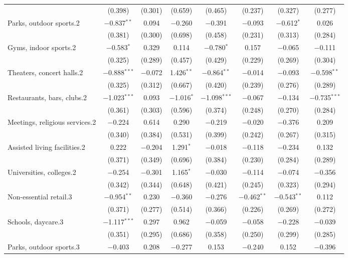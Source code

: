 \begin{table}[!htbp]
\begin{tabular}{@{\extracolsep{5pt}}lccccccc}
  & (0.398) & (0.301) & (0.659) & (0.465) & (0.237) & (0.327) & (0.277) \\ 
  Parks, outdoor sports.2 & $-$0.837$^{**}$ & 0.094 & $-$0.260 & $-$0.391 & $-$0.093 & $-$0.612$^{*}$ & 0.026 \\ 
  & (0.381) & (0.300) & (0.698) & (0.458) & (0.231) & (0.313) & (0.284) \\ 
  Gyms, indoor sports.2 & $-$0.583$^{*}$ & 0.329 & 0.114 & $-$0.780$^{*}$ & 0.157 & $-$0.065 & $-$0.111 \\ 
  & (0.325) & (0.289) & (0.457) & (0.429) & (0.229) & (0.269) & (0.304) \\ 
  Theaters, concert halls.2 & $-$0.888$^{***}$ & $-$0.072 & 1.426$^{**}$ & $-$0.864$^{**}$ & $-$0.014 & $-$0.093 & $-$0.598$^{**}$ \\ 
  & (0.325) & (0.312) & (0.667) & (0.420) & (0.239) & (0.276) & (0.289) \\ 
  Restaurants, bars, clubs.2 & $-$1.023$^{***}$ & 0.093 & $-$1.016$^{*}$ & $-$1.098$^{***}$ & $-$0.067 & $-$0.134 & $-$0.735$^{***}$ \\ 
  & (0.361) & (0.303) & (0.596) & (0.374) & (0.248) & (0.270) & (0.284) \\ 
  Meetings, religious services.2 & $-$0.224 & 0.614 & 0.290 & $-$0.219 & $-$0.020 & $-$0.376 & 0.209 \\ 
  & (0.340) & (0.384) & (0.531) & (0.399) & (0.242) & (0.267) & (0.315) \\ 
  Assisted living facilities.2 & 0.222 & $-$0.204 & 1.291$^{*}$ & $-$0.018 & $-$0.118 & $-$0.234 & 0.132 \\ 
  & (0.371) & (0.349) & (0.696) & (0.384) & (0.230) & (0.284) & (0.289) \\ 
  Universities, colleges.2 & $-$0.254 & $-$0.301 & 1.165$^{*}$ & $-$0.030 & $-$0.114 & $-$0.074 & $-$0.356 \\ 
  & (0.342) & (0.344) & (0.648) & (0.421) & (0.245) & (0.323) & (0.294) \\ 
  Non-essential retail.3 & $-$0.954$^{**}$ & 0.230 & $-$0.360 & $-$0.276 & $-$0.462$^{**}$ & $-$0.543$^{**}$ & 0.112 \\ 
  & (0.371) & (0.277) & (0.514) & (0.366) & (0.226) & (0.269) & (0.272) \\ 
  Schools, daycare.3 & $-$1.117$^{***}$ & 0.297 & 0.962 & $-$0.059 & $-$0.058 & $-$0.228 & $-$0.039 \\ 
  & (0.351) & (0.295) & (0.686) & (0.358) & (0.250) & (0.299) & (0.285) \\ 
  Parks, outdoor sports.3 & $-$0.403 & 0.208 & $-$0.277 & 0.153 & $-$0.240 & 0.152 & $-$0.396 \\ 

\end{tabular}
\end{table}
